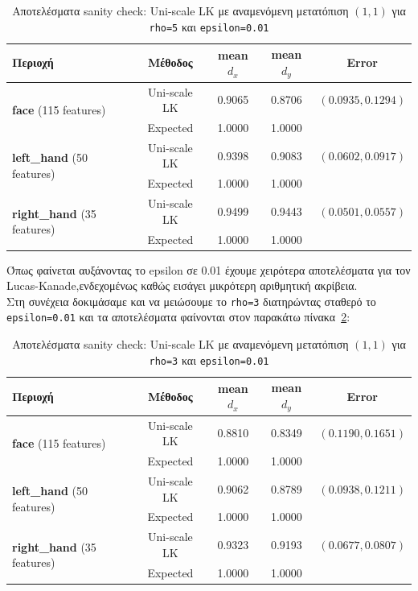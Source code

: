 \documentclass[12pt, a4paper]{article}
\begin{document}
\begin{table}[H]
\centering
\setlength{\tabcolsep}{6pt}
\begin{tabular}{lcccc}
\toprule
\textbf{Περιοχή} & \textbf{Μέθοδος} & \textbf{mean $d_x$} & \textbf{mean $d_y$} & \textbf{Error} \\
\midrule
\multirow{2}{*}{\textbf{face} (115 features)} & Uni-scale LK & 0.9065 & 0.8706 & $(0.0935, 0.1294)$ \\
 & Expected & 1.0000 & 1.0000 & \\
\midrule
\multirow{2}{*}{\textbf{left\_hand} (50 features)} & Uni-scale LK & 0.9398 & 0.9083 & $(0.0602, 0.0917)$ \\
 & Expected & 1.0000 & 1.0000 & \\
\midrule
\multirow{2}{*}{\textbf{right\_hand} (35 features)} & Uni-scale LK & 0.9499 & 0.9443 & $(0.0501, 0.0557)$ \\
 & Expected & 1.0000 & 1.0000 & \\
\bottomrule
\end{tabular}
\caption{Αποτελέσματα sanity check: Uni-scale LK με αναμενόμενη μετατόπιση $(1, 1)$ για \texttt{rho=5} και \texttt{epsilon=0.01}}
\label{table:sanity_check_2}
\end{table}
Όπως φαίνεται αυξάνοντας το {epsilon} σε 0.01 έχουμε χειρότερα  αποτελέσματα για τον Lucas-Kanade,ενδεχομένως καθώς εισάγει μικρότερη αριθμητική ακρίβεια.\\

Στη συνέχεια δοκιμάσαμε και να μειώσουμε το \texttt{rho=3} διατηρώντας σταθερό το \texttt{epsilon=0.01} και τα αποτελέσματα φαίνονται στον παρακάτω πίνακα~\ref{table:sanity_check_3}:

\begin{table}[H]
\centering
\setlength{\tabcolsep}{6pt}
\begin{tabular}{lcccc}
\toprule
\textbf{Περιοχή} & \textbf{Μέθοδος} & \textbf{mean $d_x$} & \textbf{mean $d_y$} & \textbf{Error} \\
\midrule
\multirow{2}{*}{\textbf{face} (115 features)} & Uni-scale LK & 0.8810 & 0.8349 & $(0.1190, 0.1651)$ \\
 & Expected & 1.0000 & 1.0000 & \\
\midrule
\multirow{2}{*}{\textbf{left\_hand} (50 features)} & Uni-scale LK & 0.9062 & 0.8789 & $(0.0938, 0.1211)$ \\
 & Expected & 1.0000 & 1.0000 & \\
\midrule
\multirow{2}{*}{\textbf{right\_hand} (35 features)} & Uni-scale LK & 0.9323 & 0.9193 & $(0.0677, 0.0807)$ \\
 & Expected & 1.0000 & 1.0000 & \\
\bottomrule
\end{tabular}
\caption{Αποτελέσματα sanity check: Uni-scale LK με αναμενόμενη μετατόπιση $(1, 1)$ για \texttt{rho=3} και \texttt{epsilon=0.01}}
\label{table:sanity_check_3}
\end{table}
\end{document}
